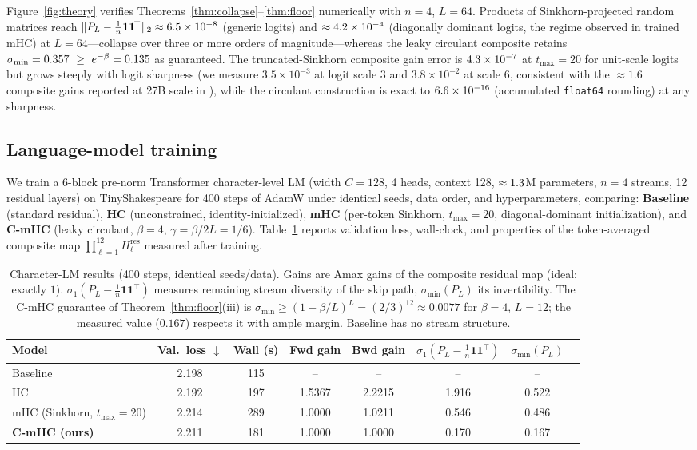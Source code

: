 \documentclass[11pt]{article}
\newcommand{\ones}{\mathbf{1}}
\newcommand{\Hres}{H^{\mathrm{res}}}
\newcommand{\J}{\tfrac{1}{n}\ones\ones^{\!\top}}
\begin{document}
Figure~\ref{fig:theory} verifies Theorems~\ref{thm:collapse}--\ref{thm:floor} numerically with $n=4$, $L=64$. Products of Sinkhorn-projected random matrices reach $\|P_L-\J\|_2\approx\sigmaDSgeneric$ (generic logits) and $\approx4.2\times10^{-4}$ (diagonally dominant logits, the regime observed in trained mHC) at $L{=}64$---collapse over three or more orders of magnitude---whereas the leaky circulant composite retains $\sigma_{\min}=\sminCirc\ \ge\ e^{-\beta}=\floorBeta$ as guaranteed. The truncated-Sinkhorn composite gain error is $4.3\times10^{-7}$ at $t_{\max}{=}20$ for unit-scale logits but grows steeply with logit sharpness (we measure $3.5\times10^{-3}$ at logit scale $3$ and $3.8\times10^{-2}$ at scale $6$, consistent with the $\approx1.6$ composite gains reported at 27B scale in \citep{xie2025mhc}), while the circulant construction is exact to $6.6\times10^{-16}$ (accumulated \texttt{float64} rounding) at any sharpness.

\subsection{Language-model training}
\label{sec:exp-train}

We train a 6-block pre-norm Transformer character-level LM (width $C{=}128$, 4 heads, context 128, $\approx1.3$M parameters, $n{=}4$ streams, 12 residual layers) on TinyShakespeare for 400 steps of AdamW under identical seeds, data order, and hyperparameters, comparing: \textbf{Baseline} (standard residual), \textbf{HC} (unconstrained, identity-initialized), \textbf{mHC} (per-token Sinkhorn, $t_{\max}{=}20$, diagonal-dominant initialization), and \textbf{C-mHC} (leaky circulant, $\beta{=}4$, $\gamma=\beta/2L=1/6$). Table~\ref{tab:train} reports validation loss, wall-clock, and properties of the token-averaged composite map $\prod_{\ell=1}^{12}\Hres_\ell$ measured after training.

\begin{table}[h]
\centering
\small
\begin{tabular}{lccccccc}
\toprule
Model & Val.\ loss $\downarrow$ & Wall (s) & Fwd gain & Bwd gain & $\sigma_1(P_L-\J)$ & $\sigma_{\min}(P_L)$ \\
\midrule
Baseline & 2.198 & 115 & -- & -- & -- & -- \\
HC & 2.192 & 197 & 1.5367 & 2.2215 & 1.916 & 0.522 \\
mHC (Sinkhorn, $t_{\max}{=}20$) & 2.214 & 289 & 1.0000 & 1.0211 & 0.546 & 0.486 \\
\textbf{C-mHC (ours)} & 2.211 & 181 & 1.0000 & 1.0000 & 0.170 & 0.167 \\
\bottomrule
\end{tabular}
\caption{Character-LM results (400 steps, identical seeds/data). Gains are Amax gains of the composite residual map (ideal: exactly $1$). $\sigma_1(P_L-\J)$ measures remaining stream diversity of the skip path, $\sigma_{\min}(P_L)$ its invertibility. The C-mHC guarantee of Theorem~\ref{thm:floor}(iii) is $\sigma_{\min}\ge(1-\beta/L)^{L}=(2/3)^{12}\approx0.0077$ for $\beta{=}4$, $L{=}12$; the measured value ($0.167$) respects it with ample margin. Baseline has no stream structure.}
\label{tab:train}
\end{table}
\end{document}
